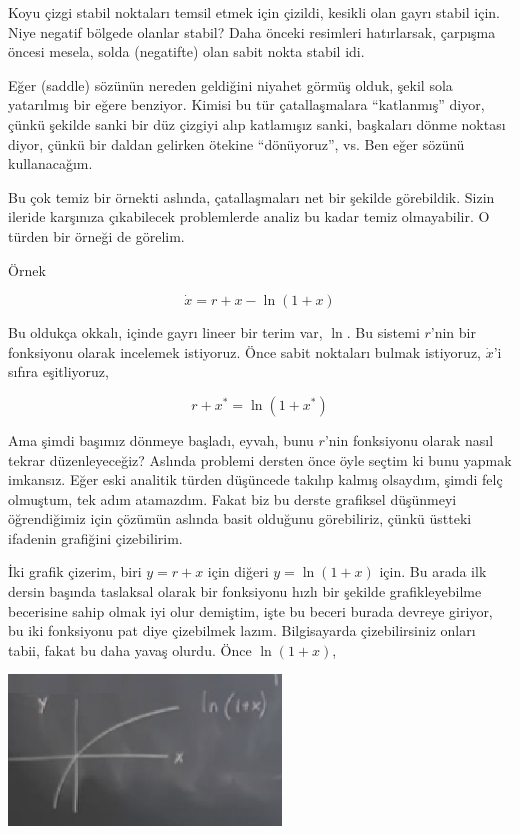 \documentclass[12pt,fleqn]{article}\usepackage{../../common}
\begin{document}
Koyu çizgi stabil noktaları temsil etmek için çizildi, kesikli olan gayrı stabil
için. Niye negatif bölgede olanlar stabil? Daha önceki resimleri hatırlarsak,
çarpışma öncesi mesela, solda (negatifte) olan sabit nokta stabil idi.

Eğer (saddle) sözünün nereden geldiğini niyahet görmüş olduk, şekil sola
yatarılmış bir eğere benziyor. Kimisi bu tür çatallaşmalara ``katlanmış'' diyor,
çünkü şekilde sanki bir düz çizgiyi alıp katlamışız sanki, başkaları dönme
noktası diyor, çünkü bir daldan gelirken ötekine ``dönüyoruz'', vs. Ben eğer
sözünü kullanacağım.

Bu çok temiz bir örnekti aslında, çatallaşmaları net bir şekilde
görebildik. Sizin ileride karşınıza çıkabilecek problemlerde analiz bu kadar
temiz olmayabilir. O türden bir örneği de görelim.

Örnek

$$ \dot{x} = r + x - \ln(1+x) $$

Bu oldukça okkalı, içinde gayrı lineer bir terim var, $\ln$. Bu sistemi $r$'nin
bir fonksiyonu olarak incelemek istiyoruz. Önce sabit noktaları bulmak
istiyoruz, $\dot{x}$'i sıfıra eşitliyoruz,

$$ r + x^\ast = \ln(1+x^\ast) $$

Ama şimdi başımız dönmeye başladı, eyvah, bunu $r$'nin fonksiyonu olarak nasıl
tekrar düzenleyeceğiz? Aslında problemi dersten önce öyle seçtim ki bunu yapmak
imkansız. Eğer eski analitik türden düşüncede takılıp kalmış olsaydım, şimdi
felç olmuştum, tek adım atamazdım. Fakat biz bu derste grafiksel düşünmeyi
öğrendiğimiz için çözümün aslında basit olduğunu görebiliriz, çünkü üstteki
ifadenin grafiğini çizebilirim.

İki grafik çizerim, biri $y = r + x$ için diğeri $y = \ln(1 + x)$ için. Bu arada
ilk dersin başında taslaksal olarak bir fonksiyonu hızlı bir şekilde
grafikleyebilme becerisine sahip olmak iyi olur demiştim, işte bu beceri burada
devreye giriyor, bu iki fonksiyonu pat diye çizebilmek lazım. Bilgisayarda
çizebilirsiniz onları tabii, fakat bu daha yavaş olurdu. Önce $\ln(1+x)$,

\includegraphics[height=4cm]{02_15.png}
\end{document}
